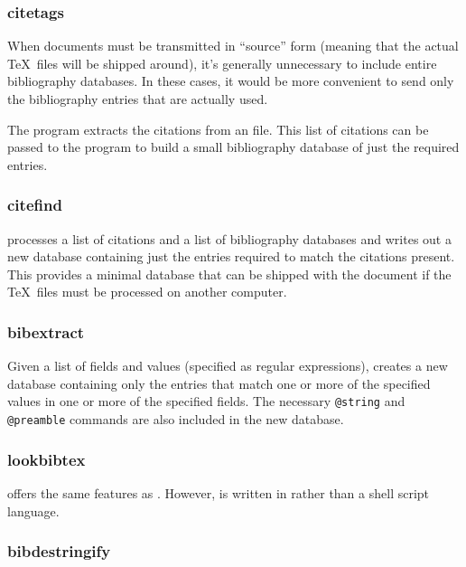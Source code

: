 \subsubsection{citetags}

When 
documents must be transmitted in ``source'' form (meaning that the 
actual \TeX\ files will be shipped around), it's generally
unnecessary to include entire bibliography databases.  In these
cases, it would be more convenient to send only the bibliography
entries that are actually used.

The  program extracts the citations from an 
file.  This list of citations can be passed to the 
program to build a small bibliography database of just the required entries.

\subsubsection{citefind}

 processes a list of citations and a list of
bibliography databases and writes out a new database containing just the
entries required to match the citations present.  This provides a minimal
database that can be shipped with the document if the \TeX\ files must be
processed on another computer.

\subsubsection{bibextract}

Given a list of fields and values (specified as regular expressions),
 creates a new database containing only the entries
that match one or more of the specified values in one or more of the
specified fields.  The necessary \verb|@string| and \verb|@preamble| commands
are also included in the new database.

\subsubsection{lookbibtex}

 offers the same features as
.  However,  is written in
 rather than a shell script language.

\subsubsection{bibdestringify}


